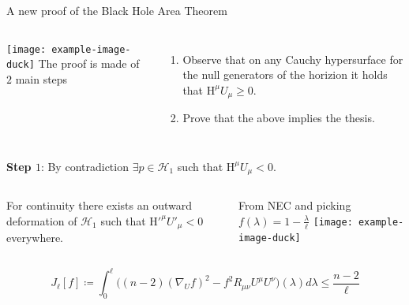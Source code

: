 \documentclass[handout]{beamer}
\begin{document}
	\begin{frame}{A new proof of the Black Hole Area Theorem}
		\begin{columns}
			\texttt{[image: example-image-duck]}
			The proof is made of \(2\) main steps
			\begin{enumerate}
				\item Observe that on any Cauchy hypersurface for the null generators of the horizion it holds that \(\mathrm{H}^{\mu}U_{\mu} \ge 0\).
				\item Prove that the above implies the thesis.
			\end{enumerate}
		\end{columns}
		\vskip 7pt
		\textbf{Step \(1\)}: By contradiction \(\exists p\in \mathscr{H}_1\) such that \(\mathrm{H}^{\mu}U_{\mu} < 0\).
		\vskip 7pt
		\begin{columns}
			\column{0.6\textwidth}
			For continuity there exists an outward deformation of \(\mathscr{H}_1\) such that \(\mathrm{H}'^{\mu}U'_{\mu} < 0\) everywhere.

			From NEC and picking \(f(\lambda) = 1 - \frac{\lambda}{\ell}\)
			\column{0.4\textwidth}
			\texttt{[image: example-image-duck]}
		\end{columns}
		\vskip 7pt
		\[
		J_{\ell}[f] \coloneqq \int_{0}^{\ell} \big((n -2)(\nabla_Uf)^2 - f^2R_{\mu\nu}U^{\mu}U^{\nu} \big)(\lambda) d\lambda \le \frac{n - 2}{\ell}
		\]

	\end{frame}
\end{document}
